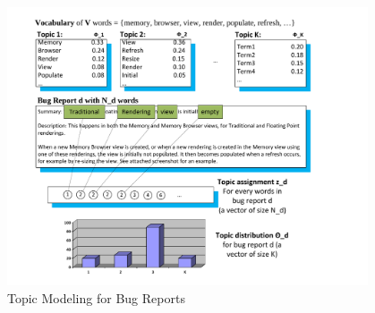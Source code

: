 %





\begin{figure}[t]
\centering
\includegraphics[width=4.2in]{irtm4}
\caption{Topic Modeling for Bug Reports~\cite{lda}}
\label{topicmodel}
\end{figure}




